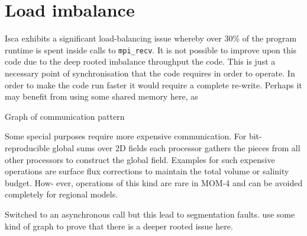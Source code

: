 \documentclass[a4paper,11pt]{report}
\begin{document}
\newpage
\section{Load imbalance}
Isca exhibits a significant load-balancing issue whereby over 30\% of the program runtime is spent inside calls to \texttt{mpi\_recv}. It is not possible to improve upon this code due to the deep rooted imbalance throughput the code. This is just a necessary point of synchronisation that the code requires in order to operate. In order to make the code run faster it would require a complete re-write. Perhaps it may benefit from using some shared memory here, as 
\par
Graph of communication pattern
\par
Some special purposes require more expensive communication. For bit-reproducible global sums over 2D fields each processor gathers the pieces from all other processors to construct the global field. Examples for such expensive operations are surface flux corrections to maintain the total volume or salinity budget. How- ever, operations of this kind are rare in MOM-4 and can be avoided completely for regional models.
\par
Switched to an asynchronous call but this lead to segmentation faults. use some kind of graph to prove that there is a deeper rooted issue here.
\par
\end{document}
